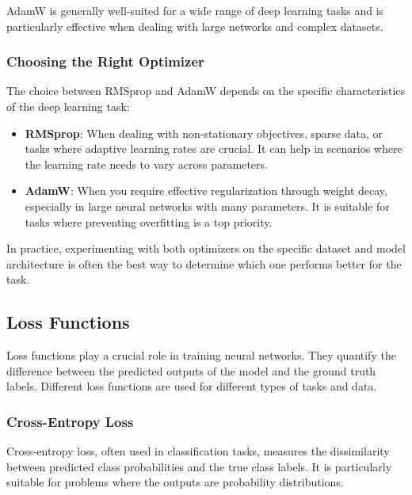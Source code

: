 AdamW is generally well-suited for a wide range of deep learning tasks and is particularly effective when dealing with large networks and complex datasets.

\subsubsection{Choosing the Right Optimizer}

The choice between RMSprop and AdamW depends on the specific characteristics of the deep learning task:

\begin{itemize}
	\item \textbf{RMSprop}: When dealing with non-stationary objectives, sparse data, or tasks where adaptive learning rates are crucial. It can help in scenarios where the learning rate needs to vary across parameters.
	
	\item \textbf{AdamW}: When you require effective regularization through weight decay, especially in large neural networks with many parameters. It is suitable for tasks where preventing overfitting is a top priority.
\end{itemize}

In practice, experimenting with both optimizers on the specific dataset and model architecture is often the best way to determine which one performs better for the task.


\subsection{Loss Functions} \label{loss}

Loss functions play a crucial role in training neural networks. They quantify the difference between the predicted outputs of the model and the ground truth labels. Different loss functions are used for different types of tasks and data.

\subsubsection{Cross-Entropy Loss} \label{sec:crossentropy}

Cross-entropy loss, often used in classification tasks, measures the dissimilarity between predicted class probabilities and the true class labels. It is particularly suitable for problems where the outputs are probability distributions.


